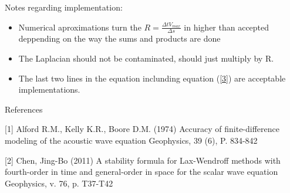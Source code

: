 \documentclass[legalpaper, 12pt]{article}
\begin{document}
Notes regarding implementation:

\begin{itemize}
\item Numerical aproximations turn the $R = \frac{\Delta t  V_{max}}{\Delta s}$ in higher than accepted deppending on the way the sums and products are done
\item The Laplacian should not be contaminated, should just multiply by R.
\item The last two lines in the equation inclunding equation (\ref{3}) are acceptable implementations.
\end{itemize}

References

[1] Alford R.M., Kelly K.R., Boore D.M. (1974) Accuracy of finite-difference modeling of the acoustic wave equation Geophysics, 39 (6), P. 834-842

[2] Chen, Jing-Bo (2011) A stability formula for Lax-Wendroff methods with fourth-order in time and general-order in space for the scalar wave equation Geophysics, v. 76, p. T37-T42
 
\end{document}
